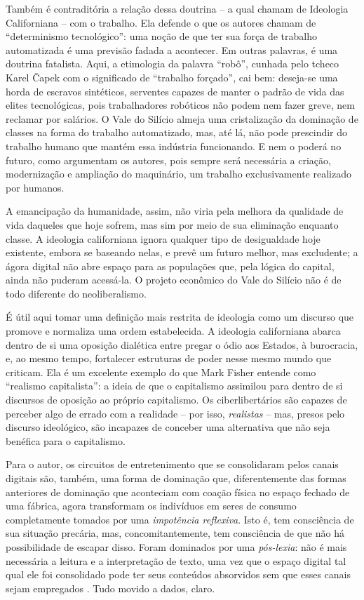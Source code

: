 Também é contraditória a relação dessa doutrina -- a qual \textcite{barbrook_ideologia_2018} chamam de Ideologia Californiana -- com o trabalho.
Ela defende o que os autores chamam de ``determinismo tecnológico'': uma noção de que ter sua força de trabalho automatizada é uma previsão fadada a acontecer.
Em outras palavras, é uma doutrina fatalista.
Aqui, a etimologia da palavra ``robô'', cunhada pelo tcheco Karel Čapek com o significado de ``trabalho forçado'', cai bem: deseja-se uma horda de escravos sintéticos, serventes capazes de manter o padrão de vida das elites tecnológicas, pois trabalhadores robóticos não podem nem fazer greve, nem reclamar por salários.
O Vale do Silício almeja uma cristalização da dominação de classes na forma do trabalho automatizado, mas, até lá, não pode prescindir do trabalho humano que mantém essa indústria funcionando.
E nem o poderá no futuro, como argumentam os autores, pois sempre será necessária a criação, modernização e ampliação do maquinário, um trabalho exclusivamente realizado por humanos.

A emancipação da humanidade, assim, não viria pela melhora da qualidade de vida daqueles que hoje sofrem, mas sim por meio de sua eliminação enquanto classe.
A ideologia californiana ignora qualquer tipo de desigualdade hoje existente, embora se baseando nelas, e prevê um futuro melhor, mas excludente; a ágora digital não abre espaço para as populações que, pela lógica do capital, ainda não puderam acessá-la.
O projeto econômico do Vale do Silício não é de todo diferente do neoliberalismo.

É útil aqui tomar uma definição mais restrita de ideologia como um discurso que promove e normaliza uma ordem estabelecida.
A ideologia californiana abarca dentro de si uma oposição dialética entre pregar o ódio aos Estados, à burocracia, e, ao mesmo tempo, fortalecer estruturas de poder nesse mesmo mundo que criticam.
Ela é um excelente exemplo do que Mark Fisher entende como ``realismo capitalista'': a ideia de que o capitalismo assimilou para dentro de si discursos de oposição ao próprio capitalismo.
Os ciberlibertários são capazes de perceber algo de errado com a realidade -- por isso, \textit{realistas} -- mas, presos pelo discurso ideológico, são incapazes de conceber uma alternativa que não seja benéfica para o capitalismo. \cite{fisher_realismo_2020}

Para o autor, os circuitos de entretenimento que se consolidaram pelos canais digitais são, também, uma forma de dominação que, diferentemente das formas anteriores de dominação que aconteciam com coação física no espaço fechado de uma fábrica, agora transformam os indivíduos em seres de consumo completamente tomados por uma \textit{impotência reflexiva}.
Isto é, tem consciência de sua situação precária, mas, concomitantemente, tem consciência de que não há possibilidade de escapar disso.
Foram dominados por uma \textit{pós-lexia}: não é mais necessária a leitura e a interpretação de texto, uma vez que o espaço digital tal qual ele foi consolidado pode ter seus conteúdos absorvidos sem que esses canais sejam empregados \cite{fisher_realismo_2020}.
Tudo movido a dados, claro.


